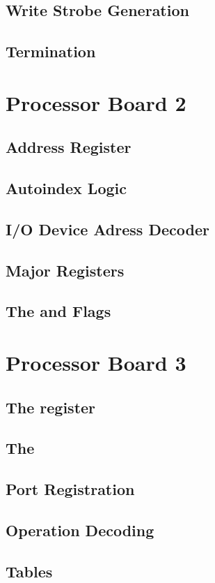 \subsection{Write Strobe Generation}
\subsection{\IBUS{} Termination}

\section{Processor Board 2}
\subsection{Address Register}
\subsection{Autoindex Logic}
\subsection{I/O Device Adress Decoder}
\subsection{Major Registers}
\subsection{The \Zreg{} and \Nreg{} Flags}

\section{Processor Board 3}
\subsection{The \Lreg{} register}
\subsection{The \ALU}
\subsection{\ALU{} Port Registration}
\subsection{\ALU{} Operation Decoding}
\subsection{\ALU{} Tables}

